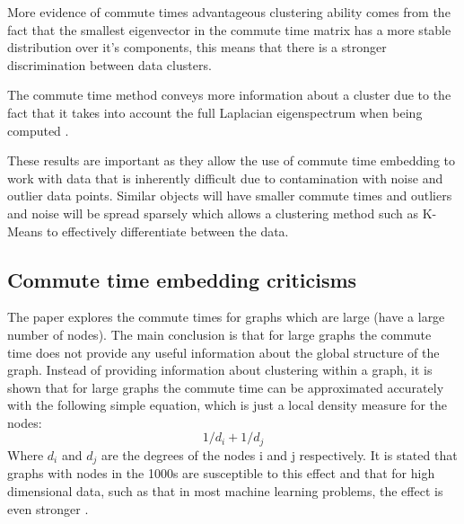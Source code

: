 \documentclass[12pt]{article} %
\begin{document}
More evidence of commute times advantageous clustering ability comes from the fact that the smallest eigenvector in the commute time matrix has a more stable distribution over it's components, this means that there is a stronger discrimination between data clusters.

The commute time method conveys more information about a cluster due to the fact that it takes into account the full Laplacian eigenspectrum when being computed \cite{commuteTime}.

These results are important as they allow the use of commute time embedding to work with data that is inherently difficult due to contamination with noise and outlier data points. Similar objects will have smaller commute times and outliers and noise will be spread sparsely which allows a clustering method such as K-Means to effectively differentiate between the data.

\subsection{Commute time embedding criticisms}
The paper explores the commute times for graphs which are large (have a large number of nodes). The main conclusion is that for large graphs the commute time does not provide any useful information about the global structure of the graph. Instead of providing information about clustering within a graph, it is shown that for large graphs the commute time can be approximated accurately with the following simple equation, which is just a local density measure for the nodes:
$$
1/d_i + 1/d_j
$$
Where $d_i$ and $d_j$ are the degrees of the nodes i and j respectively. It is stated that graphs with nodes in the 1000s are susceptible to this effect and that for high dimensional data, such as that in most machine learning problems, the effect is even stronger \cite{commuteTimeCriticism}.

\printbibliography 
\end{document}
